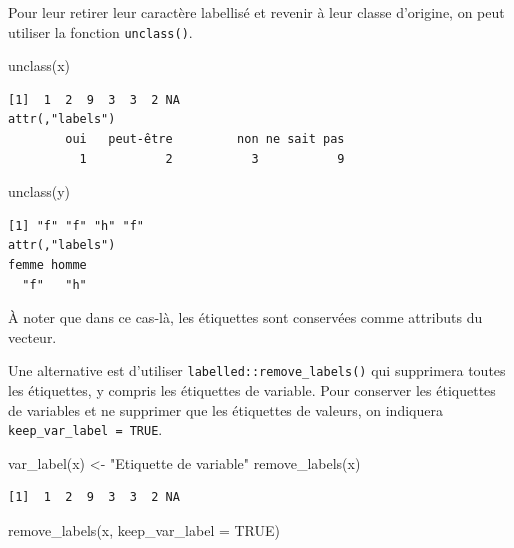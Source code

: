 \documentclass[
  letterpaper,
  DIV=11,
  numbers=noendperiod,
  oneside]{scrreprt}
\newenvironment{Shaded}{\begin{snugshade}}{\end{snugshade}}
\newcommand{\AttributeTok}[1]{\textcolor[rgb]{0.40,0.45,0.13}{#1}}
\newcommand{\ConstantTok}[1]{\textcolor[rgb]{0.56,0.35,0.01}{#1}}
\newcommand{\FunctionTok}[1]{\textcolor[rgb]{0.28,0.35,0.67}{#1}}
\newcommand{\NormalTok}[1]{\textcolor[rgb]{0.00,0.23,0.31}{#1}}
\newcommand{\OtherTok}[1]{\textcolor[rgb]{0.00,0.23,0.31}{#1}}
\newcommand{\StringTok}[1]{\textcolor[rgb]{0.13,0.47,0.30}{#1}}
\begin{document}
Pour leur retirer leur caractère labellisé et revenir à leur classe
d'origine, on peut utiliser la fonction \texttt{unclass()}.

\begin{Shaded}
\begin{Highlighting}[]
\FunctionTok{unclass}\NormalTok{(x)}
\end{Highlighting}
\end{Shaded}

\begin{verbatim}
[1]  1  2  9  3  3  2 NA
attr(,"labels")
        oui   peut-être         non ne sait pas 
          1           2           3           9 
\end{verbatim}

\begin{Shaded}
\begin{Highlighting}[]
\FunctionTok{unclass}\NormalTok{(y)}
\end{Highlighting}
\end{Shaded}

\begin{verbatim}
[1] "f" "f" "h" "f"
attr(,"labels")
femme homme 
  "f"   "h" 
\end{verbatim}

À noter que dans ce cas-là, les étiquettes sont conservées comme
attributs du vecteur.

Une alternative est d'utiliser \texttt{labelled::remove\_labels()} qui
supprimera toutes les étiquettes, y compris les étiquettes de variable.
Pour conserver les étiquettes de variables et ne supprimer que les
étiquettes de valeurs, on indiquera \texttt{keep\_var\_label\ =\ TRUE}.

\begin{Shaded}
\begin{Highlighting}[]
\FunctionTok{var\_label}\NormalTok{(x) }\OtherTok{\textless{}{-}} \StringTok{"Etiquette de variable"}
\FunctionTok{remove\_labels}\NormalTok{(x)}
\end{Highlighting}
\end{Shaded}

\begin{verbatim}
[1]  1  2  9  3  3  2 NA
\end{verbatim}

\begin{Shaded}
\begin{Highlighting}[]
\FunctionTok{remove\_labels}\NormalTok{(x, }\AttributeTok{keep\_var\_label =} \ConstantTok{TRUE}\NormalTok{)}
\end{Highlighting}
\end{Shaded}
\end{document}
